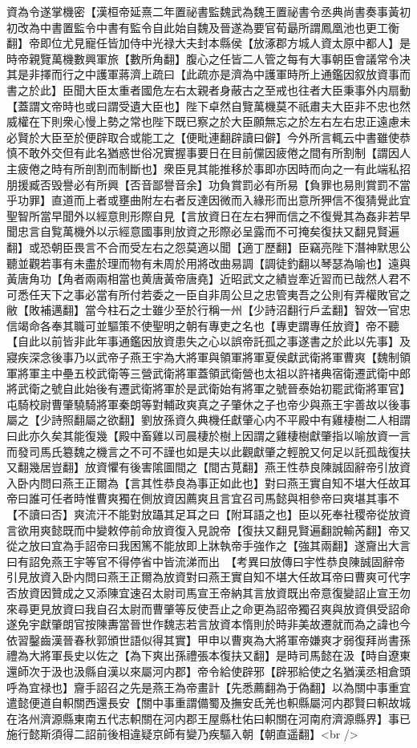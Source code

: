 資為令遂掌機密【漢桓帝延熹二年置祕書監魏武為魏王置祕書令丞典尚書奏事黃初初改為中書置監令中書有監令自此始自魏及晉遂為要官荀朂所謂鳳凰池也更工衡翻】帝即位尤見寵任皆加侍中光禄大夫封本縣侯【放涿郡方城人資太原中都人】是時帝親覽萬機數興軍旅【數所角翻】腹心之任皆二人管之每有大事朝臣會議常令决其是非擇而行之中護軍蔣濟上疏曰【此疏亦是濟為中護軍時所上通鑑因叙放資事而書之於此】臣聞大臣太重者國危左右太親者身蔽古之至戒也往者大臣秉事外内扇動【蓋謂文帝時也或曰謂受遺大臣也】陛下卓然自覽萬機莫不祇肅夫大臣非不忠也然威權在下則衆心慢上勢之常也陛下既已察之於大臣願無忘之於左右左右忠正遠慮未必賢於大臣至於便辟取合或能工之【便毗連翻辟讀曰僻】今外所言輒云中書雖使恭慎不敢外交但有此名猶惑世俗况實握事要日在目前儻因疲倦之間有所割制【謂因人主疲倦之時有所剖割而制斷也】衆臣見其能推移於事即亦因時而向之一有此端私招朋援臧否毁譽必有所興【否音鄙譽音余】功負賞罰必有所易【負罪也易則賞罰不當乎功罪】直道而上者或壅曲附左右者反達因微而入緣形而出意所狎信不復猜覺此宜聖智所當早聞外以經意則形際自見【言放資日在左右狎而信之不復覺其為姦非若早聞忠言自覧萬機外以示經意國事則放資之形際必呈露而不可掩矣復扶又翻見賢遍翻】或恐朝臣畏言不合而受左右之怨莫適以聞【適丁歷翻】臣竊亮陛下潛神默思公聽並觀若事有未盡於理而物有未周於用將改曲易調【調徒釣翻以琴瑟為喻也】遠與黃唐角功【角者兩兩相當也黄唐黃帝唐堯】近昭武文之績豈牽近習而已哉然人君不可悉任天下之事必當有所付若委之一臣自非周公旦之忠管夷吾之公則有弄權敗官之敝【敗補邁翻】當今柱石之士雖少至於行稱一州【少詩沼翻行戶孟翻】智效一官忠信竭命各奉其職可並驅策不使聖明之朝有專吏之名也【專吏謂專任放資】帝不聽【自此以前皆非此年事通鑑因放資患失之心以誤帝託孤之事遂書之於此以先事】及寢疾深念後事乃以武帝子燕王宇為大將軍與領軍將軍夏侯獻武衛將軍曹爽【魏制領軍將軍主中壘五校武衛等三營武衛將軍蓋領武衛營也太祖以許禇典宿衛遷武衛中郎將武衛之號自此始後有遷武衛將軍於是武衛始有將軍之號晉泰始初罷武衛將軍官】屯騎校尉曹肇驍騎將軍秦朗等對輔政爽真之子肇休之子也帝少與燕王宇善故以後事屬之【少詩照翻屬之欲翻】劉放孫資久典機任獻肇心内不平殿中有雞棲樹二人相謂曰此亦久矣其能復幾【殿中畜雞以司晨棲於樹上因謂之雞棲樹獻肇指以喻放資一言而發司馬氏簒魏之機言之不可不謹也如是夫以此觀獻肇之輕脫又何足以託孤哉復扶又翻幾居豈翻】放資懼有後害隂圖間之【間古莧翻】燕王性恭良陳誠固辭帝引放資入卧内問曰燕王正爾為【言其性恭良為事正如此也】對曰燕王實自知不堪大任故耳帝曰誰可任者時惟曹爽獨在側放資因薦爽且言宜召司馬懿與相參帝曰爽堪其事不【不讀曰否】爽流汗不能對放躡其足耳之曰【附耳語之也】臣以死奉社稷帝從放資言欲用爽懿既而中變敕停前命放資復入見說帝【復扶又翻見賢遍翻說輸芮翻】帝又從之放曰宜為手詔帝曰我困篤不能放即上牀執帝手強作之【強其兩翻】遂齎出大言曰有詔免燕王宇等官不得停省中皆流涕而出　【考異曰放傳曰宇性恭良陳誠固辭帝引見放資入卧内問曰燕王正爾為放資對曰燕王實自知不堪大任故耳帝曰曹爽可代字否放資因贊成之又添陳宜速召太尉司馬宣王帝納其言放資既出帝意復變詔止宣王勿來尋更見放資曰我自召太尉而曹肇等反使吾止之命更為詔帝獨召爽與放資俱受詔命遂免宇獻肇朗官按陳夀當晉世作魏志若言放資本惰則於時非美故遷就而為之諱也今依習鑿齒漢晉春秋郭頒世語似得其實】甲申以曹爽為大將軍帝嫌爽才弱復拜尚書孫禮為大將軍長史以佐之【為下爽出孫禮張本復扶又翻】是時司馬懿在汲【時自遼東還師次于汲也汲縣自漢以來屬河内郡】帝令給使辟邪【辟邪給使之名猶漢丞相倉頭呼為宜禄也】齎手詔召之先是燕王為帝畫計【先悉薦翻為于偽翻】以為關中事重宜遣懿便道自軹關西還長安【關中事重謂備蜀及撫安氐羌也軹縣屬河内郡賢曰軹故城在洛州濟源縣東南五代志軹關在河内郡王屋縣杜佑曰軹關在河南府濟源縣界】事已施行懿斯須得二詔前後相違疑京師有變乃疾驅入朝【朝直遥翻】<br />
